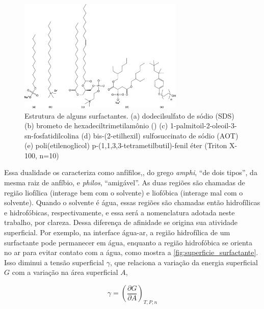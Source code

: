 	\begin{figure}[h] 
		\centering
		\includegraphics[width=0.7\textwidth]{./imagens/introducao/estrutura_surfactantes}
		\caption{Estrutura de alguns surfactantes. (a) dodecilsulfato de sódio (SDS) (b) brometo de hexadeciltrimetilamônio (\CTAB) (c) 1-palmitoil-2-oleoil-3-sn-fosfatidilcolina (d) bis-(2-etilhexil) sulfosuccinato de sódio (AOT) (e) poli(etilenoglicol) p-(1,1,3,3-tetrametilbutil)-fenil éter (Triton X-100, n=10)}
		\label{fig:estrutura_surfactantes}
	\end{figure} 
	
	Essa dualidade os caracteriza como anfífilos,\cite{ColloidalDomain}, do grego \emph{amphi}, ``de dois tipos'', da mesma raiz de anfíbio, e \emph{philos}, ``amigável''. As duas regiões são chamadas de região liofílica (interage bem com o solvente) e liofóbica (interage mal com o solvente). Quando o solvente é água, essas regiões são chamadas então hidrofílicas e hidrofóbicas, respectivamente, e essa será a nomenclatura adotada neste trabalho, por clareza. Dessa diferença de afinidade se origina sua atividade superficial. Por exemplo, na interface água-ar, a região hidrofílica de um surfactante pode permanecer em água, enquanto a região hidrofóbica se orienta no ar para evitar contato com a água, como mostra a \autoref{fig:superficie_surfactante}. Isso diminui a tensão superficial \(\gamma\), que relaciona a variação da energia superficial \(G\) com a variação na área superficial \(A\),
	
	\begin{equation}
		\gamma = \left( \dfrac{\partial G}{\partial A}  \right)_{T,P,n}
		\label{eqn:tens_superficial}
	\end{equation}
	
